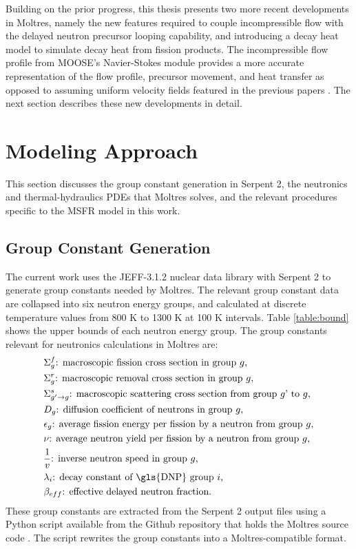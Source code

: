 Building on the prior progress, this thesis presents two more recent
developments in Moltres, namely the new features required to couple
incompressible flow with the delayed neutron precursor looping capability, and
introducing a decay heat model to simulate decay heat from fission products.
The incompressible flow profile from \gls{MOOSE}'s Navier-Stokes module
provides a more accurate representation of the flow profile, precursor
movement, and heat transfer as opposed to assuming uniform velocity fields
featured in the previous papers \cite{lindsay_introduction_2018,
park_safety_2019}. The next section describes these new developments in
detail.

\section{Modeling Approach}

This section discusses the group constant generation in Serpent 2, the
neutronics and thermal-hydraulics \glspl{PDE} that Moltres solves, and the
relevant procedures specific to the \gls{MSFR} model in this work.

\subsection{Group Constant Generation}

The current work uses the JEFF-3.1.2 nuclear data library
\cite{oecd/nea_jeff-3.1.2_2014} with Serpent 2 to generate group constants
needed by Moltres. The relevant group constant data are collapsed into six
neutron energy groups, and calculated at discrete temperature values from 800
K to 1300 K at 100 K intervals. Table \ref{table:bound} shows the upper bounds
of each neutron energy group. The group constants relevant for neutronics
calculations in Moltres are:
%
\begin{align*}
    &\Sigma^f_{g} \text{: macroscopic fission cross section in group $g$,} \\
    &\Sigma^r_{g} \text{: macroscopic removal cross section in group $g$,} \\
    &\Sigma^s_{g' \rightarrow g} \text{: macroscopic scattering cross section
    from group $g$' to $g$,} \\
    &D_g \text{: diffusion coefficient of neutrons in group $g$,} \\
    &\epsilon_g \text{: average fission energy per fission by a neutron from
    group $g$,} \\
    &\nu \text{: average neutron yield per fission by a neutron from group
    $g$,} \\
    &\frac{1}{v} \text{: inverse neutron speed in group $g$,} \\
    &\lambda_i \text{: decay constant of \gls{DNP} group $i$,} \\
    &\beta_{eff} \text{: effective delayed neutron fraction.} \\
\end{align*}
%
These group constants are extracted from
the Serpent 2 output files using a Python script available from the Github
repository that holds the Moltres source code \cite{lindsay_moltres_2017}. The
script rewrites the group constants into a Moltres-compatible format.

